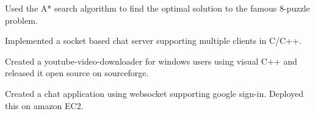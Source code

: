 



\begin{cventries}

\cvproject
{
    \begin{cvitems} %
        \item {Used the A* search algorithm to find the optimal solution to the famous 8-puzzle problem.}
        \item {Implemented a socket based chat server supporting multiple clients in C/C++.}
        \item {Created a youtube-video-downloader for windows users using visual C++ and released it open source on sourceforge.}
        \item {Created a chat application using websocket supporting google sign-in. Deployed this on amazon EC2.}
        \end{cvitems}
}

\end{cventries}
